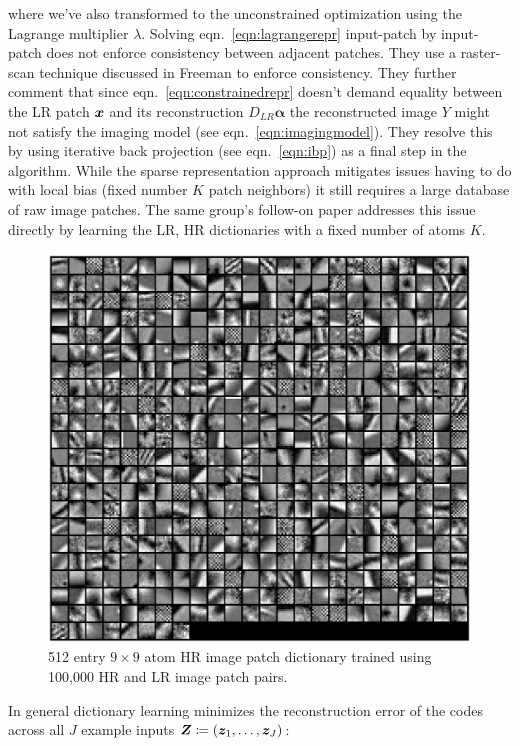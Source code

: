 where we've also transformed to the unconstrained optimization using the Lagrange multiplier \(\lambda\).
%
Solving eqn.~\eqref{eqn:lagrangerepr} input-patch by input-patch does not enforce consistency between adjacent patches.
%
They use a raster-scan technique discussed in Freeman \etal\cite{freeman2002example} to enforce consistency.
%
They further comment that since eqn.~\eqref{eqn:constrainedrepr} doesn't demand equality between the LR patch \(\bm{x}\) and its reconstruction \(D_{LR}\bm{\alpha}\) the reconstructed image \(Y\) might not satisfy the imaging model (see eqn.~\eqref{eqn:imagingmodel}).
%
They resolve this by using iterative back projection (see eqn.~\eqref{eqn:ibp}) as a final step in the algorithm.
%
While the sparse representation approach mitigates issues having to do with local bias (fixed number \(K\) patch neighbors) it still requires a large database of raw image patches.
%
The same group's follow-on paper\cite{yang2010} addresses this issue directly by learning the LR, HR dictionaries with a fixed number of atoms \(K\).
\begin{figure}
	\centering
	\includegraphics[width=\linewidth,keepaspectratio]{figures/classical/dictpatches.png}
	\caption{512 entry \(9 \times 9\) atom HR image patch dictionary trained using 100,000 HR and LR image patch pairs\cite{yang2010}.}
	\label{fig:hrpatchdict}
\end{figure}
%
In general dictionary learning minimizes the reconstruction error of the codes across all \(J\) example inputs \(\bm{Z} \coloneqq \left( \bm{z}_1, \mathellipsis, \bm{z}_J \right)\):
